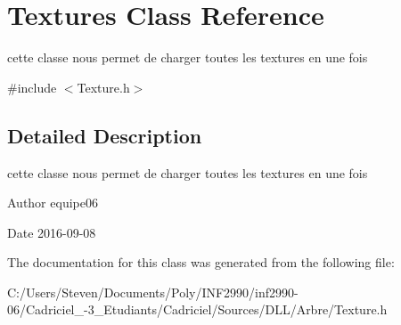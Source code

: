 \hypertarget{class_textures}{}\section{Textures Class Reference}
\label{class_textures}


cette classe nous permet de charger toutes les textures en une fois  




{\ttfamily \#include $<$Texture.\+h$>$}



\subsection{Detailed Description}
cette classe nous permet de charger toutes les textures en une fois 

\begin{DoxyAuthor}{Author}
equipe06 
\end{DoxyAuthor}
\begin{DoxyDate}{Date}
2016-\/09-\/08 
\end{DoxyDate}


The documentation for this class was generated from the following file\+:\begin{DoxyCompactItemize}
\item 
C\+:/\+Users/\+Steven/\+Documents/\+Poly/\+I\+N\+F2990/inf2990-\/06/\+Cadriciel\+\_-\/3\+\_\+\+Etudiants/\+Cadriciel/\+Sources/\+D\+L\+L/\+Arbre/Texture.\+h\end{DoxyCompactItemize}
